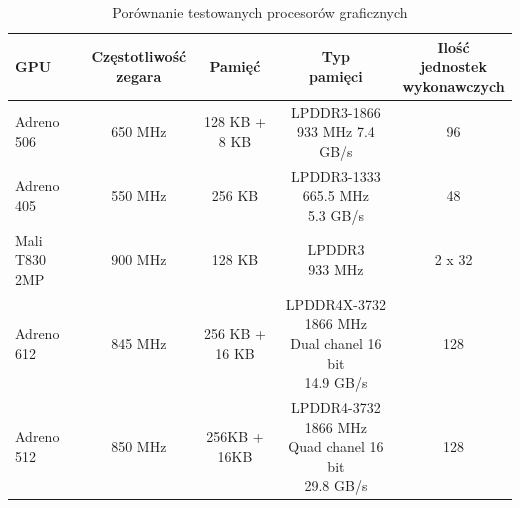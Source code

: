 \begin{table}[H]
    \caption{Porównanie testowanych procesorów graficznych}
    \label{tab:skale}
    \begin{tabular}{|l|c|c|c|c|}
\hline
\textbf{GPU} & \makecell{\textbf{Częstotliwość} \\ \textbf{zegara}} & \textbf{Pamięć} & \makecell{\textbf{Typ} \\ \textbf{pamięci}} & \makecell{\textbf{Ilość jednostek} \\ \textbf{wykonawczych}}\\
\hline
Adreno 506 & 650 MHz & 128 KB + 8 KB & \makecell{LPDDR3-1866 \\ 933 MHz 7.4 GB/s} & 96\\
\hline
Adreno 405 & 550 MHz & 256 KB & \makecell{LPDDR3-1333 665.5 MHz \\ 5.3 GB/s} & 48\\
\hline
Mali T830 2MP & 900 MHz & 128 KB & \makecell{LPDDR3 \\ 933 MHz} & 2 x 32\\
\hline
Adreno 612 & 845 MHz & 256 KB + 16 KB & \makecell{LPDDR4X-3732 1866 MHz \\ Dual chanel 16 bit \\ 14.9 GB/s} & 128\\
\hline
Adreno 512 & 850 MHz & 256KB + 16KB & \makecell{LPDDR4-3732 1866 MHz \\ Quad chanel 16 bit \\ 29.8 GB/s} & 128\\
\hline
\end{tabular}
\end{table}




